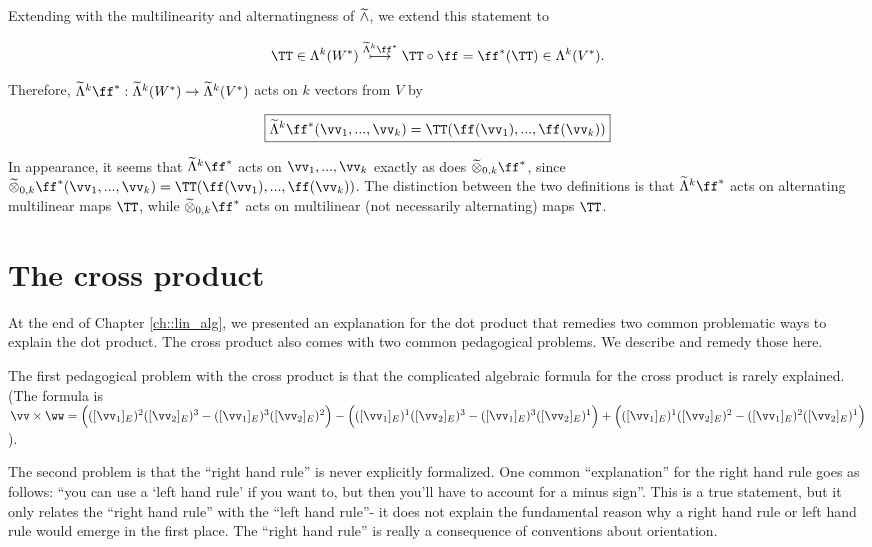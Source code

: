 \begin{deriv}
    Extending with the multilinearity and alternatingness of $\widetilde{\wedge}$, we extend this statement to
    
    \begin{align*}
        \TT \in \Lambda^k(W^*) \overset{\tLambda^k \ff^*}{\longmapsto} \TT \circ \ff = \ff^*(\TT) \in \Lambda^k(V^*).
    \end{align*}
    
    Therefore, $\tLambda^k \ff^*:\tLambda^k(W^*) \rightarrow \tLambda^k(V^*)$ acts on $k$ vectors from $V$ by
    
    \begin{align*}
        \boxed
        {
            \tLambda^k \ff^*(\vv_1, ..., \vv_k) = \TT(\ff(\vv_1), ..., \ff(\vv_k))
        }
    \end{align*}
    
    In appearance, it seems that $\tLambda^k \ff^*$ acts on $\vv_1, ..., \vv_k$ exactly as does $\totimes_{0,k} \ff^*$, since $\totimes_{0,k} \ff^*(\vv_1, ..., \vv_k) = \TT(\ff(\vv_1), ..., \ff(\vv_k))$. The distinction between the two definitions is that $\tLambda^k \ff^*$ acts on alternating multilinear maps $\TT$, while $\totimes_{0,k} \ff^*$ acts on multilinear (not necessarily alternating) maps $\TT$.
\end{deriv}

\newpage

\section{The cross product}
\label{ch::exterior_pwrs::section::cross_product}

At the end of Chapter \ref{ch::lin_alg}, we presented an explanation for the dot product that remedies two common problematic ways to explain the dot product. The cross product also comes with two common pedagogical problems. We describe and remedy those here.

The first pedagogical problem with the cross product is that the complicated algebraic formula for the cross product is rarely explained. (The formula is $\vv \times \ww = \Big( ([\vv_1]_E)^2 ([\vv_2]_E)^3 - ([\vv_1]_E)^3 ([\vv_2]_E)^2 \Big) - \Big( ([\vv_1]_E)^1 ([\vv_2]_E)^3 - ([\vv_1]_E)^3 ([\vv_2]_E)^1 \Big) + \Big( ([\vv_1]_E)^1 ([\vv_2]_E)^2 - ([\vv_1]_E)^2 ([\vv_2]_E)^1 \Big)$).

The second problem is that the ``right hand rule'' is never explicitly formalized. One common ``explanation'' for the right hand rule goes as follows: ``you can use a `left hand rule' if you want to, but then you'll have to account for a minus sign''. This is a true statement, but it only relates the ``right hand rule'' with the ``left hand rule''- it does not explain the fundamental reason why a right hand rule or left hand rule would emerge in the first place. The ``right hand rule'' is really a consequence of conventions about orientation.

